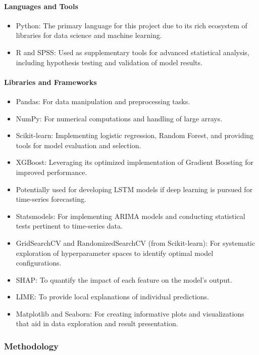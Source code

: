 \documentclass[conference]{IEEEtran}
\begin{document}
\paragraph{Languages and Tools}
\begin{itemize}
    \item Python: The primary language for this project due to its rich ecosystem of libraries for data science and machine learning.
    \item R and SPSS: Used as supplementary tools for advanced statistical analysis, including hypothesis testing and validation of model results.
\end{itemize}

\paragraph{Libraries and Frameworks}
\begin{itemize}
    \item Pandas: For data manipulation and preprocessing tasks.
    \item NumPy: For numerical computations and handling of large arrays.
    \item Scikit-learn: Implementing logistic regression, Random Forest, and providing tools for model evaluation and selection.
    \item  XGBoost: Leveraging its optimized implementation of Gradient Boosting for improved performance.
    \item Potentially used for developing LSTM models if deep learning is pursued for time-series forecasting.
    \item Statsmodels: For implementing ARIMA models and conducting statistical tests pertinent to time-series data.
    \item GridSearchCV and RandomizedSearchCV (from Scikit-learn): For systematic exploration of hyperparameter spaces to identify optimal model configurations.
    \item SHAP: To quantify the impact of each feature on the model's output.
    \item LIME: To provide local explanations of individual predictions.
    \item Matplotlib and Seaborn: For creating informative plots and visualizations that aid in data exploration and result presentation.
\end{itemize}

\subsubsection{Methodology}
\end{document}
